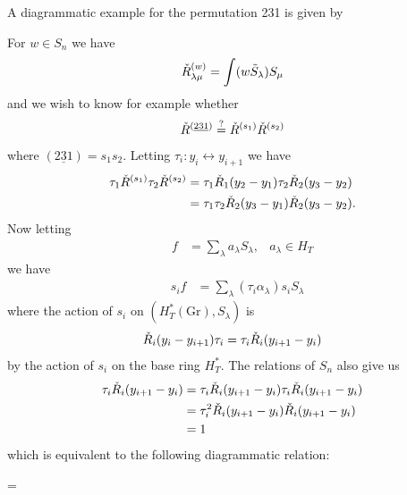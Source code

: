 \documentclass[12pt]{amsart}
\numberwithin{equation}{section}
\theoremstyle{definition}
\numberwithin{figure}{section}
\begin{document}
A diagrammatic example for the permutation 231 is given by
\begin{center}
\end{center}
For $w\in S_n$ we have
\begin{align*}
	&&\Check{R}_{\lambda\mu}^{(w)}&=\int (w\Tilde{S}_\lambda)S_\mu&
\end{align*}
and we wish to know for example whether
\begin{align*}
	&&\Check{R}^{(\underline{231})}&\stackrel{?}{=} \Check{R}^{(s_1)} \Check{R}^{(s_2)}&
\end{align*}
where $(\underline{231})=s_1s_2$. Letting $\tau_i: y_i\leftrightarrow y_{i+1}$ we have
\begin{align*}
	&&\tau_1\Check{R}^{(s_1)}\tau_2\Check{R}^{(s_2)}&=\tau_1\Check{R}_1(y_2-y_1)\tau_2\Check{R}_2(y_3-y_2)&\\
	&&&=\tau_1\tau_2\Check{R}_2(y_3-y_1)\Check{R}_2(y_3-y_2).&
\end{align*}
Now letting
\begin{align*}
	&&f&=\sum_\lambda a_\lambda S_\lambda, &a_\lambda\in H_T
\end{align*}
we have
\begin{align*}
	&&s_if&=\sum_\lambda(\tau_i\alpha_\lambda)s_iS_\lambda&
\end{align*}
where the action of $s_i$ on $(H_T^*(\mathrm{Gr}),S_\lambda)$ is 
\begin{align*}
	&&\Check{R}_i(y_i-y_{i+1})\tau_i&=\tau_i\Check{R}_i(y_{i+1}-y_i)&
\end{align*}
by the action of $s_i$ on the base ring $H_T^*$. The relations of $S_n$ also give us
\begin{align*}
	&&\tau_i\Check{R}_i(y_{i+1}-y_i)&=\tau_i\Check{R}_i(y_{i+1}-y_i)\tau_i \Check{R}_i(y_{i+1}-y_i)&\\
	&&&=\tau_i^2\Check{R}_i(y_{i+1}-y_i)\Check{R}_i(y_{i+1}-y_i)&\\
	&&&=1&
\end{align*}
which is equivalent to the following diagrammatic relation:
\begin{center}
	 = 
\end{center}
\end{document}
